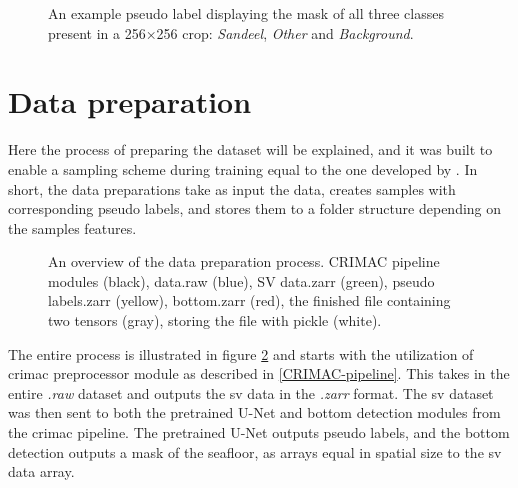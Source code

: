         \begin{figure}[H]
        \centering
        	\label{subfig:correct}
        	
        
        
        
        \caption[Pseudo label]{An example pseudo label displaying the mask of all three classes present in a 256×256 crop: \textit{Sandeel}, \textit{Other} and \textit{Background}.} %
        \label{data sample fig}
        
        \end{figure}


        
    \section{Data preparation}
        Here the process of preparing the dataset will be explained, and it was built to enable a sampling scheme during training equal to the one developed by \citeauthor{brautaset2020acoustic}. In short, the data preparations take as input the data, creates samples with corresponding pseudo labels, and stores them to a folder structure depending on the samples features.
        
        \clearpage
        \begin{figure}[H]
            \centering
            
            \caption[Data preparation process]{An overview of the data preparation process. CRIMAC pipeline modules (black), data.raw (blue), SV data.zarr (green), pseudo labels.zarr (yellow), bottom.zarr (red), the finished file containing two tensors (gray), storing the file with pickle (white).}
          	\medskip 
            \label{data_generation_flowchart_fig}
        \end{figure}
        
        The entire process is illustrated in figure \ref{data_generation_flowchart_fig} and starts with the utilization of \gls{crimac} preprocessor module as described in \ref{CRIMAC-pipeline}. This takes in the entire \textit{.raw} dataset and outputs the \gls{sv} data in the \textit{.zarr} format. The \gls{sv} dataset was then sent to both the pretrained U-Net and bottom detection modules from the \gls{crimac} pipeline. The pretrained U-Net outputs pseudo labels, and the bottom detection outputs a mask of the seafloor, as arrays equal in spatial size to the \gls{sv} data array.
        
